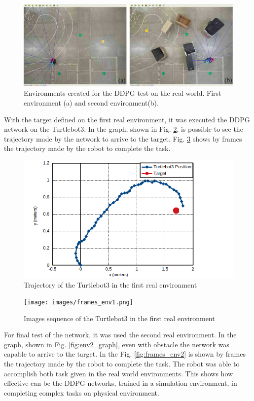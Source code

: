 \begin{figure}[H]
\centerline{\includegraphics[width=12cm]{images/real_envs.png}}
\caption{Environments created for the DDPG test on the real world. First environment (a) and second environment(b).}
\label{fig:real_envs}
\end{figure}

With the target defined on the first real environment, it was executed the DDPG network on the Turtlebot3.
In the graph, shown in Fig. \ref{fig:env1_graph}, is possible to see the trajectory made by the network to arrive to the target.
Fig. \ref{fig:frames_env1} shows by frames the trajectory made by the robot to complete the task.

\begin{figure}[H]
\centerline{\includegraphics[width=12cm]{images/env1_graph.png}}
\caption{Trajectory of the Turtlebot3 in the first real environment}
\label{fig:env1_graph}
\end{figure}

\begin{figure}[H]
\centerline{\texttt{[image: images/frames\_env1.png]}}
\caption{Images sequence of the Turtlebot3 in the first real environment}
\label{fig:frames_env1}
\end{figure}

For final test of the network, it was used the second real environment. In the graph, shown in Fig. \ref{fig:env2_graph}, even with obstacle the network was capable to arrive to the target. In the Fig. \ref{fig:frames_env2} is shown by frames the trajectory made by the robot to complete the task. %
The robot was able to accomplish both task given in the real world environments.
This shows how effective can be the DDPG networks, trained in a simulation environment, in completing complex tasks on physical environment.

